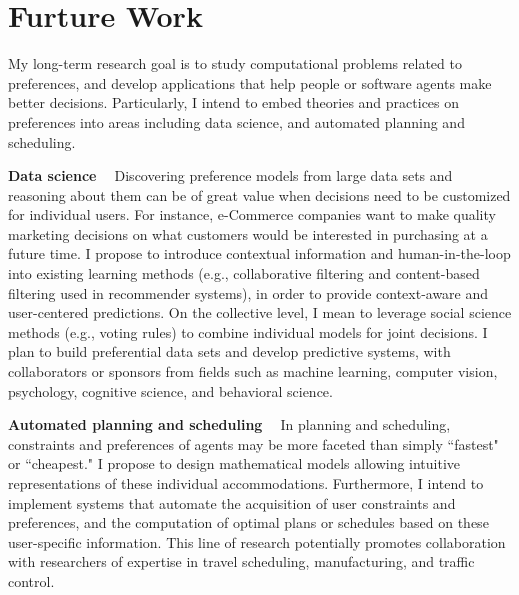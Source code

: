 \section{Furture Work}

My long-term research goal is to study computational problems related to preferences, and 
develop applications that help people or software agents make better decisions.
Particularly, I intend to embed theories and practices on preferences into areas including
data science, and automated planning and scheduling.

\smallskip \noindent \textbf{Data science \  } Discovering preference 
models from large data sets and reasoning about them 
can be of great value when decisions need to be customized for individual users.
For instance, e-Commerce companies want to make quality marketing decisions
on what customers would be interested in purchasing at a future time.
I propose to introduce contextual information and human-in-the-loop into existing learning methods
(e.g., collaborative filtering and content-based filtering used in recommender systems), 
in order to provide context-aware and user-centered predictions.
On the collective level, I mean to leverage social science methods (e.g., voting rules)
to combine individual models for joint decisions.
I plan to build preferential data sets and develop predictive systems, with collaborators
or sponsors from fields 
such as machine learning, computer vision, psychology, cognitive science, and behavioral science.

\smallskip \noindent \textbf{Automated planning and scheduling \  }
In planning and scheduling, constraints and preferences of agents may be more faceted than simply
``fastest" or ``cheapest."
I propose to design mathematical models allowing
intuitive representations of these individual accommodations. 
Furthermore, I intend to implement systems
that automate the acquisition of user constraints and preferences, 
and the computation of optimal plans or schedules 
based on these user-specific information.
This line of research potentially promotes collaboration with researchers of expertise in
travel scheduling, manufacturing, and traffic control.
